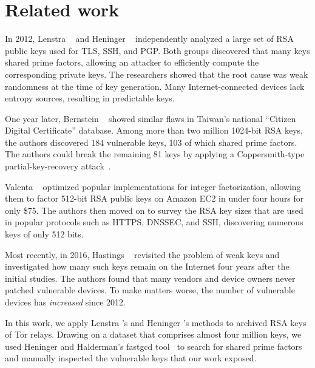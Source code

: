 \section{Related work}
\label{sec:related}
In 2012, Lenstra \ea~\cite{Lenstra2012a} and Heninger \ea~\cite{Heninger2012a}
independently analyzed a large set of RSA public keys used for TLS, SSH, and
PGP.  Both groups discovered that many keys shared prime factors, allowing an
attacker to efficiently compute the corresponding private keys.  The researchers
showed that the root cause was weak randomness at the time of key generation.
Many Internet-connected devices lack entropy sources, resulting in predictable
keys.

One year later, Bernstein \ea~\cite{Bernstein2013a} showed similar flaws in
Taiwan's national ``Citizen Digital Certificate'' database.  Among more than two
million 1024-bit RSA keys, the authors discovered 184 vulnerable keys, 103 of
which shared prime factors.  The authors could break the remaining 81 keys by
applying a Coppersmith-type partial-key-recovery
attack~\cite{Coppersmith1996a,Coppersmith1997a}.

Valenta \ea~\cite{Valenta2016a} optimized popular implementations for integer
factorization, allowing them to factor 512-bit RSA public keys on Amazon EC2 in
under four hours for only \$75.  The authors then moved on to survey the RSA key
sizes that are used in popular protocols such as HTTPS, DNSSEC, and SSH,
discovering numerous keys of only 512 bits.

Most recently, in 2016, Hastings \ea~\cite{Hastings2016a} revisited the problem
of weak keys and investigated how many such keys remain on the Internet four
years after the initial studies.  The authors found that many vendors and device
owners never patched vulnerable devices.  To make matters worse, the number of
vulnerable devices has \emph{increased} since 2012.

In this work, we apply Lenstra \ea's and Heninger \ea's methods to archived RSA
keys of Tor relays.  Drawing on a dataset that comprises almost four million
keys, we used Heninger and Halderman's fastgcd tool~\cite{fastgcd} to
search for shared prime factors and manually inspected the vulnerable keys that
our work exposed.
